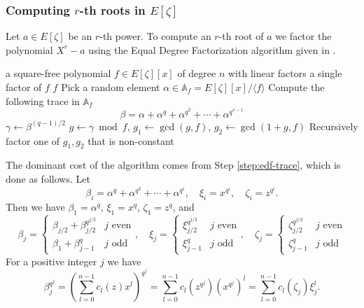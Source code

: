 \documentclass[12pt]{article}
\theoremstyle{plain}
\theoremstyle{definition}
\newcounter{algorithm}
\begin{document}

\subsubsection{Computing $r$-th roots in $E[\zeta]$}
\label{subsection:rth-root-fpz}

Let $a \in E[\zeta]$ be an $r$-th power. To compute an $r$-th root of $a$ we factor the 
polynomial $X^r - a$ using the Equal Degree Factorization algorithm given in 
\cite{kaltofen+shoup97}.
\begin{algorithm}
	\label{algorithm:edf}
	\begin{algorithmic}[1]
		\REQUIRE a square-free polynomial $f \in E[\zeta][x]$ of degree $n$ with linear factors
		\ENSURE a single factor of $f$
		\RETURN $f$
		\ENDIF
		\STATE Pick a random element $\alpha \in \mathbb{A}_f = E[\zeta][x]/\langle f \rangle$
		\STATE\label{step:edf-trace} Compute the following trace in $\mathbb{A}_f$
		\[ \beta = \alpha + \alpha^q + \alpha^{q^2} + \cdots + \alpha^{q^{s - 1}} \]
		\STATE $\gamma \leftarrow \beta^{(q - 1) / 2}$
		\STATE $g \leftarrow \gamma \bmod f$, $g_1 \leftarrow \gcd(g, f)$, $g_2 \leftarrow \gcd(1 + 
		g, f)$
		\STATE Recursively factor one of $g_1, g_2$ that is non-constant
	\end{algorithmic}
\end{algorithm}
The dominant cost of the algorithm comes from Step \ref{step:edf-trace}, which is done as follows. 
Let
\[ \beta_i = \alpha^q + \alpha^{q^2} + \cdots + \alpha^{q^i}, \quad \xi_i = x^{q^i}, \quad \zeta_i 
= z^{q^i}. \]
Then we have $\beta_1 = \alpha^q$, $\xi_1 = x^q$, $\zeta_1 = z^q$, and
\[
\beta_j = 
\begin{cases}
	\beta_{j / 2} + \beta_{j / 2}^{q^{j / 2}} & j \text{ even} \\
	\beta_1 + \beta_{j - 1}^q & j \text{ odd}
\end{cases}, \quad
\xi_j = 
\begin{cases}
	\xi_{j / 2}^{q^{j / 2}} & j \text{ even} \\
	\xi_{j - 1}^q & j \text{ odd}
\end{cases}, \quad
\zeta_j = 
\begin{cases}
	\zeta_{j / 2}^{q^{j / 2}} & j \text{ even} \\
	\zeta_{j - 1}^q & j \text{ odd}
\end{cases}
\]
For a positive integer $j$ we have
\begin{equation}
	\label{equation:betaj}
	\beta_j^{q^j} = \left( \sum_{l = 0}^{n - 1}c_l(z)x^l \right)^{q^j} = \sum_{l = 0}^{n - 
	1}c_l(z^{q^j})(x^{q^j})^l = \sum_{l = 0}^{n - 1}c_l(\zeta_j)\xi_j^l.
\end{equation}
\end{document}
